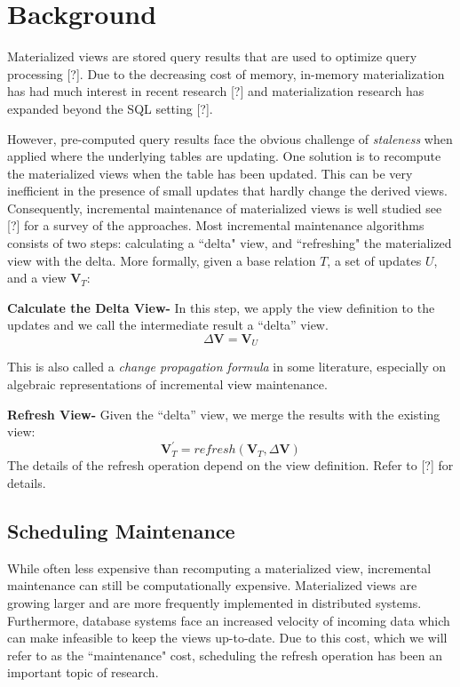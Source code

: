 \section{Background}
Materialized views are stored query results that are used 
to optimize query processing [?].
Due to the decreasing cost of memory, in-memory materialization 
has had much interest in recent research [?] and materialization 
research has expanded beyond the SQL setting [?].

However, pre-computed query results face the obvious challenge of \emph{staleness} when applied
where the underlying tables are updating.
One solution is to recompute the materialized views when the table has been updated.
This can be very inefficient in the presence of small updates that hardly change the derived views.
Consequently, incremental maintenance of materialized views is well studied see [?]
for a survey of the approaches. 
Most incremental maintenance algorithms consists of two steps: calculating a ``delta" view,
and ``refreshing" the materialized view with the delta.
More formally, given a base relation $T$, a set of updates $U$,
and a view $\textbf{V}_{T}$:

\textbf{Calculate the Delta View- }
In this step, we apply the view definition to the updates and we call
the intermediate result a ``delta'' view.
\[
\Delta\textbf{V}=\textbf{V}_{U}
\]

This is also called a \emph{change propagation formula} in some literature,
especially on algebraic representations of incremental view maintenance.

\textbf{Refresh View- }
Given the ``delta'' view, we merge the results with the existing
view:
\[
\textbf{V}_{T}^{'}=refresh(\textbf{V}_{T},\Delta\textbf{V})
\] 
The details of the refresh operation depend on the view definition.
Refer to [?] for details.


\subsection{Scheduling Maintenance}
While often less expensive than recomputing a materialized view,
incremental maintenance can still be computationally expensive.
Materialized views are growing larger and are more frequently 
implemented in distributed systems.
Furthermore, database systems face an increased velocity of incoming data which
can make infeasible to keep the views up-to-date.
Due to this cost, which we will refer to as the ``maintenance" cost, 
scheduling the refresh operation has been an important topic of research.

